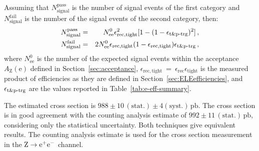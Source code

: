Assuming that $N_\mathrm{signal}^\mathrm{pass}$ is the number of signal events of the first 
category and $N_\mathrm{signal}^\mathrm{fail}$ is the number of the signal events of the 
second category, then:
\begin{eqnarray}
 \label{eqSIMFIT_Pass}
   N_\mathrm{signal}^\mathrm{pass} & = & N^0_\mathrm{ee}\epsilon_\mathrm{rec,tight}^2[1 - (1 -  \epsilon_{\textrm{t\&p-trg}}  )^2]\,,  \\
  \label{eqSIMFIT_Fail}
   N_\mathrm{signal}^\mathrm{fail} & = & 2N^0_\mathrm{ee}\epsilon_\mathrm{rec,tight}(1 - \epsilon_\mathrm{rec,tight}) \epsilon_{\textrm{t\&p-trg}}  \,,  \\
\end{eqnarray}
where $N^0_\mathrm{ee}$ is the number of the expected signal events within the acceptance $A_\mathrm{Z}\mathrm{(e)}$ defined in
Section~\ref{sec:acceptance},
$\epsilon_\mathrm{rec,tight}$~=~$\epsilon_\mathrm{rec}$$\epsilon_\mathrm{tight}$ is the measured product of efficiencies
as they are defined in Section~\ref{sec:ELEefficiencies}, and $ \epsilon_{\textrm{t\&p-trg}}  $ are the values reported in Table~\ref{tab:e-eff-summary}.

The estimated cross section is $988 \pm 10\, \mathrm{(stat.)} \pm 4\mathrm{(syst.)}\,\mathrm{pb}$.
The cross section is in good agreement with the counting analysis estimate of
 $992 \pm 11\, \mathrm{(stat.)}\,\mathrm{pb}$, considering only the statistical uncertainty.
Both techniques give equivalent results. The counting analysis estimate is used for the
cross section measurement in the $\mathrm{Z} \rightarrow \mathrm{e}^+\mathrm{e}^-$ channel.



